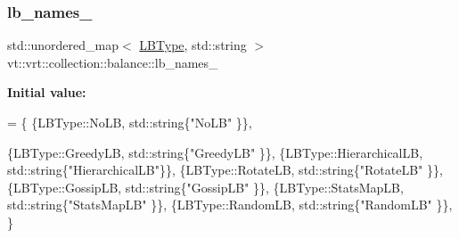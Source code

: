 \subsubsection{\texorpdfstring{lb\+\_\+names\+\_\+}{lb\_names\_}}
{\footnotesize\ttfamily std\+::unordered\+\_\+map$<$ \hyperlink{namespacevt_1_1vrt_1_1collection_1_1balance_ac4f99693509affcc67db182d4aad9b5c}{L\+B\+Type}, std\+::string $>$ vt\+::vrt\+::collection\+::balance\+::lb\+\_\+names\+\_\+}

{\bfseries Initial value\+:}
\begin{DoxyCode}
= \{
  \{LBType::NoLB,           std::string\{\textcolor{stringliteral}{"NoLB"}          \}\},



  \{LBType::GreedyLB,       std::string\{\textcolor{stringliteral}{"GreedyLB"}      \}\},
  \{LBType::HierarchicalLB, std::string\{\textcolor{stringliteral}{"HierarchicalLB"}\}\},
  \{LBType::RotateLB,       std::string\{\textcolor{stringliteral}{"RotateLB"}      \}\},
  \{LBType::GossipLB,       std::string\{\textcolor{stringliteral}{"GossipLB"}      \}\},
  \{LBType::StatsMapLB,     std::string\{\textcolor{stringliteral}{"StatsMapLB"}    \}\},
  \{LBType::RandomLB,       std::string\{\textcolor{stringliteral}{"RandomLB"}      \}\},
\}
\end{DoxyCode}
